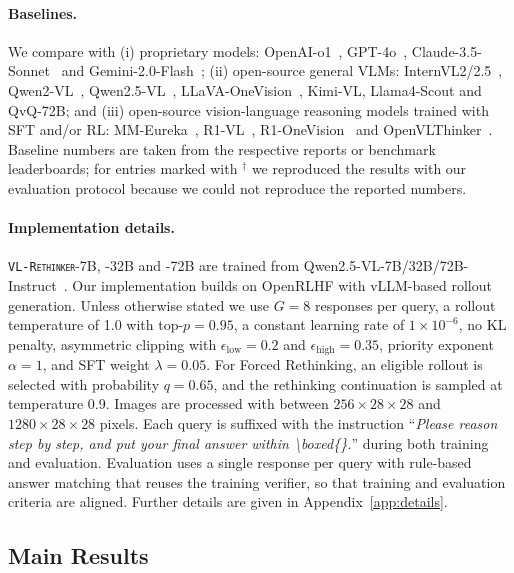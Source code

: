 \documentclass{article}
\newcommand{\model}{\texttt{\textsc{VL-Rethinker}}\xspace}
\begin{document}
\paragraph{Baselines.} We compare with (i) proprietary models: OpenAI-o1~\citep{openai-o1}, GPT-4o~\citep{gpt4o}, Claude-3.5-Sonnet~\citep{claude35} and Gemini-2.0-Flash~\citep{gemini}; (ii) open-source general VLMs: InternVL2/2.5~\citep{internvl_2_5}, Qwen2-VL~\citep{qwen2vl}, Qwen2.5-VL~\citep{qwen2_5_vl}, LLaVA-OneVision~\citep{llavaov}, Kimi-VL, Llama4-Scout and QvQ-72B; and (iii) open-source vision-language reasoning models trained with SFT and/or RL: MM-Eureka~\citep{mmeureka}, R1-VL~\citep{r1vl}, R1-OneVision~\citep{R1OneVision} and OpenVLThinker~\citep{OpenVLThinker}. Baseline numbers are taken from the respective reports or benchmark leaderboards; for entries marked with $^\dagger$ we reproduced the results with our evaluation protocol because we could not reproduce the reported numbers.

\paragraph{Implementation details.} \model-7B, -32B and -72B are trained from Qwen2.5-VL-7B/32B/72B-Instruct~\citep{qwen2_5_vl}. Our implementation builds on OpenRLHF with vLLM-based rollout generation. Unless otherwise stated we use $G=8$ responses per query, a rollout temperature of 1.0 with top-$p=0.95$, a constant learning rate of $1\times10^{-6}$, no KL penalty, asymmetric clipping with $\epsilon_\mathrm{low}=0.2$ and $\epsilon_\mathrm{high}=0.35$, priority exponent $\alpha=1$, and SFT weight $\lambda=0.05$. For Forced Rethinking, an eligible rollout is selected with probability $q=0.65$, and the rethinking continuation is sampled at temperature 0.9. Images are processed with between $256\times28\times28$ and $1280\times28\times28$ pixels. Each query is suffixed with the instruction ``\emph{Please reason step by step, and put your final answer within \textbackslash boxed\{\}.}'' during both training and evaluation. Evaluation uses a single response per query with rule-based answer matching that reuses the training verifier, so that training and evaluation criteria are aligned. Further details are given in Appendix~\ref{app:details}.

\subsection{Main Results}
\label{sec:main}
\end{document}

